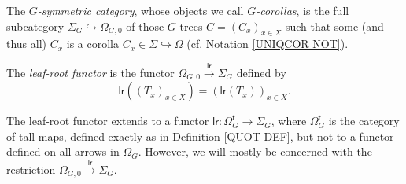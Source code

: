 \documentclass[a4paper,10pt]{article}%
\begin{document}
\begin{definition}
	The \textit{$G$-symmetric category},
	whose objects we call \textit{$G$-corollas}, is the full subcategory 
	$\Sigma_G \hookrightarrow \Omega_{G,0}$ of those $G$-trees
	$C = (C_x)_{x \in X}$ such that some (and thus all) $C_x$ is a corolla $C_x \in \Sigma \hookrightarrow \Omega$
	(cf. Notation \ref{UNIQCOR NOT}).
\end{definition}


\begin{definition}
	The \textit{leaf-root functor} is the functor $\Omega_{G,0} \xrightarrow{\mathsf{lr}} \Sigma_G$ defined by 
\[
	\mathsf{lr}\left((T_x)_{x \in X}\right)=
	\left(\mathsf{lr}(T_x)\right)_{x \in X}.
\]
\end{definition}


\begin{remark}
	The leaf-root functor extends 
	to a functor $\mathsf{lr} \colon \Omega^{\mathsf{t}}_G \to \Sigma_G$, 
	where $\Omega^{\mathsf{t}}_G$ is the category of tall maps, defined exactly as in Definition \ref{QUOT DEF}, but not to a functor defined on all arrows in $\Omega_G$.
	However, we will mostly be concerned with the restriction  
	$\Omega_{G,0} \xrightarrow{\mathsf{lr}} \Sigma_G$.
\end{remark}
\end{document}

